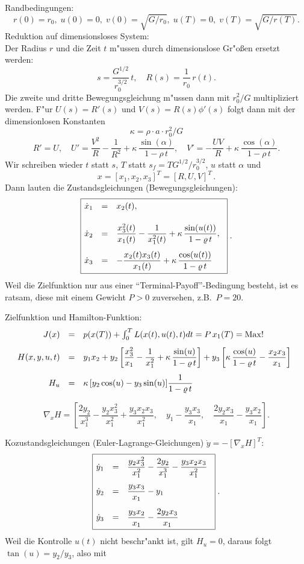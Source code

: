 \documentclass[12pt,a4paper,twoside,leqno]{article}
\begin{document}
%
Randbedingungen:
\[
r(0) = r_0, \; u(0) = 0, \; v(0) = \sqrt{G/r_0}, \;
u(T) = 0, \; v(T) = \sqrt{G/r(T)}.
\]
%
Reduktion auf dimensionsloses System:\\
Der Radius $r$ und die Zeit $t$ m"ussen durch dimensionslose Gr"o\ss en ersetzt
werden:
\[
s = \frac{G^{1/2}}{r_0^{3/2}}\, t, \quad R(s) = \frac{1}{r_0}\, r(t).
\]
Die zweite und dritte Bewegungsgleichung m"ussen dann mit $r^2_0/G$
multipliziert werden. F"ur $U(s) = R'(s)$ und $V(s) = R(s)\phi '(s)$
folgt dann mit der dimensionlosen Konstanten
\[
\kappa = \rho  \cdot a \cdot r^2_0 /G
\]
%
\[
R' = U, \quad
U' =  \frac{V^2}{R} - \frac{1}{R^2} + \kappa\,\frac{\sin (\alpha )}{1 - \rho\,
t}, \quad
V' =  - \frac{UV}{R} + \kappa\,\frac{\cos (\alpha )}{1 - \rho\,  t}.
\]
%
Wir schreiben wieder $t$ statt $s$, $T$ statt $s_f = TG^{1/2}/r_0^{3/2}$, $u$
statt $\alpha $ und
\[
x = [x_1,x_2,x_3]^T = [R,U,V]^T\,.
\]
%
Dann lauten die Zustandsgleichungen (Bewegungsgleichungen):
\[
\fbox{$
\ba{.}{rcl}
\dot{x}_1 &=& x_2(t),\\[5mm]
\dot{x}_2 &=& \dis \frac{x_3^2(t)}{x_1(t)} - \frac{1}{x_1^2(t)}
+ \kappa \,\frac{\sin (u(t))}{1 - \rho \, t},\\[5mm]
\dot{x}_3 &=& \dis - \frac{x_2(t)x_3(t)}{x_1(t)}
 + \kappa \,\frac{\cos (u(t))}{1 - \rho \,t}
\ea{.}
$}\; .
\]
Weil die Zielfunktion nur aus einer ``Terminal-Payoff''-Bedingung besteht,
ist es ratsam, diese mit einem Gewicht $P >0$ zuversehen, z.B.\ $P = 20$.
\par
Zielfunktion und {\sc Hamilton}-Funktion:
%
\[
\ba{.}{rcl}
J(x) &=& p(x(T)) + \int_0^TL(x(t),u(t),t)dt = P\,x_1(T) = \Max !\\[3mm]
%
H(x,y,u,t) &=&  \dis y_1x_2
+ y_2\left[ \frac{x^2_3}{x_1} - \frac{1}{x_1^2} +
\kappa\, \frac{\sin(u)}{1 - \rho \,t}\right]
+ y_3\left[\kappa\, \frac{\cos (u)}{1 - \rho \,t}
- \frac{x_2x_3}{x_1}\right]
\\[5mm]
%
H_u &=& \dis \kappa\, [y_2 \cos (u) - y_3 \sin(u)]\frac{1}{1 - \rho \, t}\\
\ea{.}
\]

\[
\nabla_x H  = \left[\frac{2y_2}{x_1^3} - \frac{y_2x_3^2}{x_1^2} +
         \frac{y_3x_2x_3}{x_1^2}, \quad
          y_1 - \frac{y_3x_3}{x_1}, \quad
         \frac{2y_2x_3}{x_1} - \frac{y_3x_2}{x_1}\right].
\]

Kozustandsgleichungen ({\sc Euler-Lagrange}-Gleichungen)
$\dot{y} = - [\nabla_x H]^T$:
%
\[
\fbox{$
\ba{.}{rcl}
\dot{y}_1 &=& \dis \frac{y_2x_3^2}{x_1^2} - \frac{2y_2}{x_1^3}
                   -\frac{y_3x_2x_3}{x_1^2}\\[5mm]
\dot{y}_2 &=& \dis \frac{y_3x_3}{x_1} - y_1\\[5mm]
\dot{y}_3 &=& \dis \frac{y_3x_2}{x_1} - \frac{2y_2x_3}{x_1}
\ea{.}
$}\; .
\]
%
Weil die Kontrolle $u(t)$ nicht beschr"ankt ist, gilt $H_u = 0$, daraus
folgt $\tan(u) = y_2/y_3$, also mit
\end{document}
